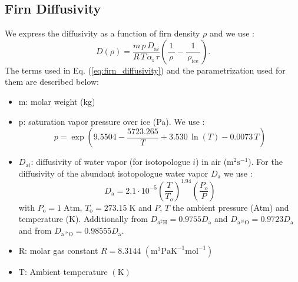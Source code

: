 \documentclass[11pt, draftcls, onecolumn]{IEEEtran} %
\numberwithin{equation}{section}
\numberwithin{table}{section}
\numberwithin{figure}{section}
\begin{document}
\begin{appendices}
	

\section{Firn Diffusivity} \label{sec:appendix_firn_diffusion}
	
We express the diffusivity as a function of firn density $\rho$ and we use \citep{Johnsen2000}:
\begin{equation}
D\!\left(\rho\right) = \frac{m\,p\,D_{\mathrm{a}i}}{R\,T\,\alpha_\mathrm{i}\,\tau}
\left(\frac{\,1\,}{\,\rho\,} - \frac{\,1\,}{\,\rho_{\mathrm{ice}}\,}\right).
\label{eq:firn_diffusivity}
\end{equation}
The terms used in Eq. (\ref{eq:firn_diffusivity}) and the parametrization used for them are described below:
\begin{itemize}

\item{m: molar weight  (kg)}

\item{p: saturation vapor pressure over ice (Pa). We use \citep{Murphy2006}:
\begin{equation}
p = \exp \left(9.5504 - \frac{5723.265}{T} + 3.530\,\ln\!\left( T \right) - 0.0073\,T \right)
\label{eq:sat_vap_pres}
\end{equation}}

\item{$D_{\mathrm{a}i}$:  diffusivity of water vapor (for isotopologue $i$) in air ($\mathrm{m}^2 \mathrm{s}^{-1}$). 
For the diffusivity of the abundant isotopologue water vapor $D_{\mathrm{a}}$ we use \citep{Hall1976}:
\begin{equation}
D_{\mathrm{a}} = 2.1\cdot 10^{-5} {\left(\frac{T}{T_o}\right)}^{1.94} \left(\frac{P_o}{P}\right) 
\label{eq:air_diffusivity}
\end{equation}
with $P_{\mathrm{o}} = 1 \;\mathrm{Atm}$, $T_{\mathrm{o}} = 273.15 \;\mathrm{K}$  and $P, \,T$ the ambient pressure (Atm) and temperature (K).
Additionally from \cite{MerlivatandJouzel} $D_{a^2\mathrm{H}} = 0.9755{D_{\mathrm{a}}}$ and 
$D_{\mathrm{a}^{18}\mathrm{O}} = 0.9723{D_{\mathrm{a}}}$ and from \cite{Barkan2007}
$D_{\mathrm{a}^{17}\mathrm{O}} = 0.98555{D_{\mathrm{a}}}$.}

\item{R: molar gas constant $R = 8.3144 \,\,(\mathrm{m}^3\mathrm{PaK}^{-1}\mathrm{mol}^{-1})$}

\item{T: Ambient temperature $(\mathrm{K})$}


\end{itemize}
\end{appendices}
\end{document}
